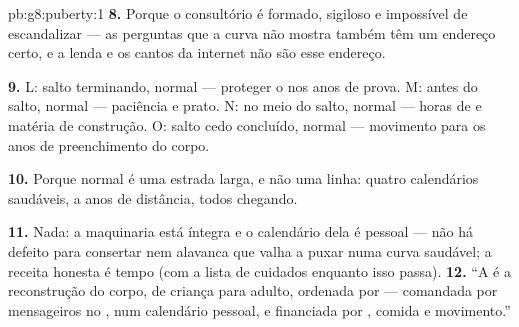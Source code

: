 \begin{solution}{pb:g8:puberty:1}
\textbf{8.} Porque o consultório é formado, sigiloso e impossível de
escandalizar --- as perguntas que a curva não mostra também têm um
endereço certo, e a lenda e os cantos da internet não são esse
endereço.

\textbf{9.} L: salto terminando, normal --- proteger o  nos anos de
prova. M: antes do salto, normal --- paciência e prato. N: no meio do
salto, normal --- horas de  e matéria de construção. O: salto cedo
concluído, normal --- movimento para os anos de preenchimento do corpo.

\textbf{10.} Porque normal é uma estrada larga, e não uma linha:
quatro calendários saudáveis, a anos de distância, todos chegando.

\textbf{11.} Nada: a maquinaria está íntegra e o calendário dela é
pessoal --- não há defeito para consertar nem alavanca que valha a 
puxar numa curva saudável; a receita honesta é tempo (com a lista de
cuidados enquanto isso passa).
\textbf{12.} ``A  é a reconstrução do corpo, de criança para
adulto, ordenada por  --- comandada por mensageiros no
, num calendário pessoal, e financiada por , comida e
movimento.''
\end{solution}
